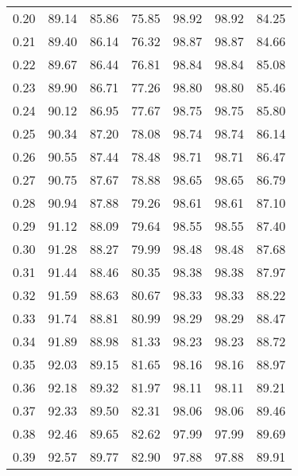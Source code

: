\begin{tabular}{|c|c|c|c|c|c|c|}
      0.20 &     89.14 &     85.86 &      75.85 &   98.92 &      98.92 &         84.25 \\
      0.21 &     89.40 &     86.14 &      76.32 &   98.87 &      98.87 &         84.66 \\
      0.22 &     89.67 &     86.44 &      76.81 &   98.84 &      98.84 &         85.08 \\
      0.23 &     89.90 &     86.71 &      77.26 &   98.80 &      98.80 &         85.46 \\
      0.24 &     90.12 &     86.95 &      77.67 &   98.75 &      98.75 &         85.80 \\
      0.25 &     90.34 &     87.20 &      78.08 &   98.74 &      98.74 &         86.14 \\
      0.26 &     90.55 &     87.44 &      78.48 &   98.71 &      98.71 &         86.47 \\
      0.27 &     90.75 &     87.67 &      78.88 &   98.65 &      98.65 &         86.79 \\
      0.28 &     90.94 &     87.88 &      79.26 &   98.61 &      98.61 &         87.10 \\
      0.29 &     91.12 &     88.09 &      79.64 &   98.55 &      98.55 &         87.40 \\
      0.30 &     91.28 &     88.27 &      79.99 &   98.48 &      98.48 &         87.68 \\
      0.31 &     91.44 &     88.46 &      80.35 &   98.38 &      98.38 &         87.97 \\
      0.32 &     91.59 &     88.63 &      80.67 &   98.33 &      98.33 &         88.22 \\
      0.33 &     91.74 &     88.81 &      80.99 &   98.29 &      98.29 &         88.47 \\
      0.34 &     91.89 &     88.98 &      81.33 &   98.23 &      98.23 &         88.72 \\
      0.35 &     92.03 &     89.15 &      81.65 &   98.16 &      98.16 &         88.97 \\
      0.36 &     92.18 &     89.32 &      81.97 &   98.11 &      98.11 &         89.21 \\
      0.37 &     92.33 &     89.50 &      82.31 &   98.06 &      98.06 &         89.46 \\
      0.38 &     92.46 &     89.65 &      82.62 &   97.99 &      97.99 &         89.69 \\
      0.39 &     92.57 &     89.77 &      82.90 &   97.88 &      97.88 &         89.91 \\

\end{tabular}
